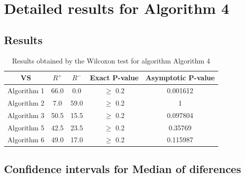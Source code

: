 \documentclass[a4paper,10pt]{article}
\begin{document}
 \clearpage 


\section{Detailed results for Algorithm 4}


\subsection{Results}

\begin{table}[!htp]
\centering\small
\begin{tabular}{
|c|c|c|c|c|}
\hline
 VS & $R^{+}$ & $R^{-}$ & Exact P-value & Asymptotic P-value \\ \hline 
Algorithm 1 & 66.0 & 0.0 & $\geq$ 0.2 & 0.001612\\ \hline 
Algorithm 2 & 7.0 & 59.0 & $\geq$ 0.2 & 1\\ \hline 
Algorithm 3 & 50.5 & 15.5 & $\geq$ 0.2 & 0.097804\\ \hline 
Algorithm 5 & 42.5 & 23.5 & $\geq$ 0.2 & 0.35769\\ \hline 
Algorithm 6 & 49.0 & 17.0 & $\geq$ 0.2 & 0.115987\\ \hline 

\end{tabular}
\caption{Results obtained by the Wilcoxon test for algorithm Algorithm 4}
\end{table}

\subsection{Confidence intervals for Median of diferences}
\end{document}

